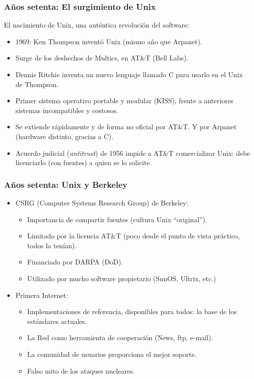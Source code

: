 \documentclass{beamer}
\begin{document}
\begin{frame}
\frametitle{Años setenta: El surgimiento de Unix}

El nacimiento de Unix, una auténtica revolución del software:

\begin{itemize}

\item 1969: Ken Thompson inventó Unix (mismo año que Arpanet).
\item Surge de los deshechos de Multics, en AT\&T (Bell Labs). 
\item Dennis Ritchie inventa un nuevo lenguaje llamado C para usarlo en el Unix de Thompson. 
\item Primer sistema operativo portable y modular (KISS), frente a anteriores sistemas incompatibles y costosos.
\item Se extiende rápidamente y de forma no oficial por AT\&T. Y por Arpanet (hardware distinto, gracias a C).
\item Acuerdo judicial (\textit{antitrust}) de 1956 impide a AT\&T comercializar Unix: debe licenciarlo (con fuentes) a quien se lo solicite.

\end{itemize}

\end{frame}


\begin{frame}
\frametitle{Años setenta: Unix y Berkeley}

\begin{itemize}

\item CSRG (Computer Systems Research Group) de Berkeley:
	\begin{itemize}
	\item Importancia de compartir fuentes (cultura Unix ``original'').
	\item Limitado por la licencia AT\&T (poco desde el punto de vista práctico, todos la tenían).
	\item Financiado por DARPA (DoD).
	\item Utilizado por mucho software propietario (SunOS, Ultrix, etc.)
	\end{itemize}

\item Primera Internet:
	\begin{itemize}
	\item Implementaciones de referencia, disponibles para todos: la base de los estándares actuales.
	\item La Red como herramienta de cooperación (News, ftp, e-mail).
	\item La comunidad de usuarios proporciona el mejor soporte.
        \item Falso mito de los ataques nucleares. 
	\end{itemize}

\end{itemize}

\end{frame}
\end{document}
